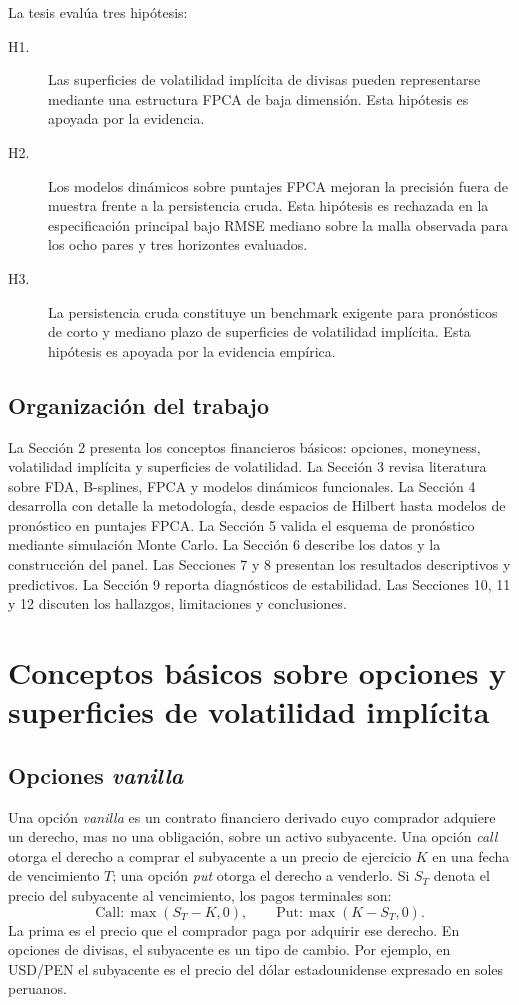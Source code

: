 \documentclass[a4paper,11pt]{article}
\newcommand{\SVIs}{superficies de volatilidad implícita}
\begin{document}
La tesis evalúa tres hipótesis:

\begin{description}
  \item[H1.] Las \SVIs{} de divisas pueden representarse mediante una estructura FPCA de baja dimensión. Esta hipótesis es apoyada por la evidencia.
  \item[H2.] Los modelos dinámicos sobre puntajes FPCA mejoran la precisión fuera de muestra frente a la persistencia cruda. Esta hipótesis es rechazada en la especificación principal bajo RMSE mediano sobre la malla observada para los ocho pares y tres horizontes evaluados.
  \item[H3.] La persistencia cruda constituye un benchmark exigente para pronósticos de corto y mediano plazo de \SVIs{}. Esta hipótesis es apoyada por la evidencia empírica.
\end{description}

\subsection{Organización del trabajo}

La Sección 2 presenta los conceptos financieros básicos: opciones, moneyness, volatilidad implícita y superficies de volatilidad. La Sección 3 revisa literatura sobre FDA, B-splines, FPCA y modelos dinámicos funcionales. La Sección 4 desarrolla con detalle la metodología, desde espacios de Hilbert hasta modelos de pronóstico en puntajes FPCA. La Sección 5 valida el esquema de pronóstico mediante simulación Monte Carlo. La Sección 6 describe los datos y la construcción del panel. Las Secciones 7 y 8 presentan los resultados descriptivos y predictivos. La Sección 9 reporta diagnósticos de estabilidad. Las Secciones 10, 11 y 12 discuten los hallazgos, limitaciones y conclusiones.

\section{Conceptos básicos sobre opciones y superficies de volatilidad implícita}

\subsection{Opciones \emph{vanilla}}

Una opción \emph{vanilla} es un contrato financiero derivado cuyo comprador adquiere un derecho, mas no una obligación, sobre un activo subyacente. Una opción \emph{call} otorga el derecho a comprar el subyacente a un precio de ejercicio \(K\) en una fecha de vencimiento \(T\); una opción \emph{put} otorga el derecho a venderlo. Si \(S_T\) denota el precio del subyacente al vencimiento, los pagos terminales son:
\[
  \text{Call}: \max(S_T-K,0),\qquad
  \text{Put}: \max(K-S_T,0).
\]
La prima es el precio que el comprador paga por adquirir ese derecho. En opciones de divisas, el subyacente es un tipo de cambio. Por ejemplo, en USD/PEN el subyacente es el precio del dólar estadounidense expresado en soles peruanos.
\end{document}
